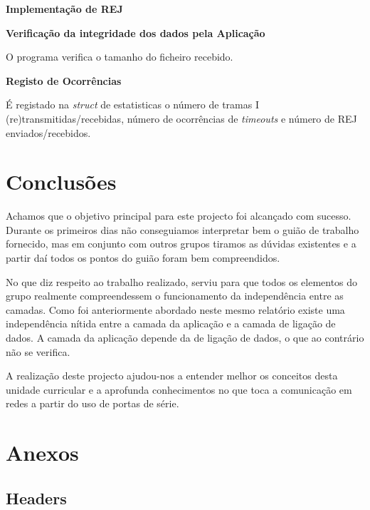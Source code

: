 \documentclass[11pt]{article}
\begin{document}
\textbf{Implementação de REJ}
\small
{}

\normalsize

\textbf{Verificação da integridade dos dados pela Aplicação}
\par O programa verifica o tamanho do ficheiro recebido.\newline
\par\textbf{Registo de Ocorrências}
\par É registado na \textit{struct} de estatisticas o número de tramas I (re)transmitidas/recebidas, número de ocorrências de \textit{timeouts} e número de REJ enviados/recebidos.



\newpage
\section{Conclusões}
Achamos que o objetivo principal para este projecto foi alcançado com sucesso. Durante os primeiros dias não conseguiamos interpretar bem o guião de trabalho fornecido, mas em conjunto com outros grupos tiramos as dúvidas existentes e a partir daí todos os pontos do guião foram bem compreendidos. 

No que diz respeito ao trabalho realizado, serviu para que todos os elementos do grupo realmente compreendessem o funcionamento da independência entre as camadas. Como foi anteriormente abordado neste mesmo relatório existe uma independência nítida entre a camada da aplicação e a camada de ligação de dados. A camada da aplicação depende da de ligação de dados, o que ao contrário não se verifica.

A realização deste projecto ajudou-nos a entender melhor os conceitos desta unidade curricular e a aprofunda conhecimentos no que toca a comunicação em redes a partir do uso de portas de série. 



\newpage
\section{Anexos}
\small


\subsection{Headers}
\end{document}
